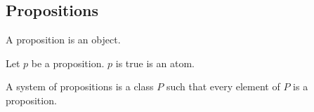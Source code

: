 \documentclass{article}
\begin{document}
\subsection{Propositions}

\begin{forthel}
  \begin{signature*}
    A proposition is an object.
  \end{signature*}

  \begin{signature*}
    Let $p$ be a proposition.
    $p$ is true is an atom.
  \end{signature*}

  \begin{definition*}
    A system of propositions is a class $P$ such that every element of $P$ is a proposition.
  \end{definition*}
\end{forthel}
\end{document}
